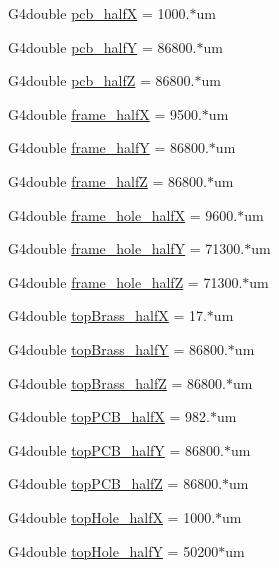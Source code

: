 \begin{DoxyCompactItemize}
G4double \hyperlink{structUMConfig_a89f67c198c9542cc4421a2dc60c52b36}{pcb\+\_\+half\+X} = 1000.$\ast$um
\item 
G4double \hyperlink{structUMConfig_a6c1fe8140f1fd3613eb3d4b1f77ca13e}{pcb\+\_\+half\+Y} = 86800.$\ast$um
\item 
G4double \hyperlink{structUMConfig_a05fe3c41c98a76ff002c175229aedecc}{pcb\+\_\+half\+Z} = 86800.$\ast$um
\item 
G4double \hyperlink{structUMConfig_aafe2777462b266d6e826f29780f41734}{frame\+\_\+half\+X} = 9500.$\ast$um
\item 
G4double \hyperlink{structUMConfig_a1c381ab5ce297e813cdd3b107c3b3273}{frame\+\_\+half\+Y} = 86800.$\ast$um
\item 
G4double \hyperlink{structUMConfig_aadc0e348b160d53a5a5b86ff0574c6d0}{frame\+\_\+half\+Z} = 86800.$\ast$um
\item 
G4double \hyperlink{structUMConfig_a5904fb1d13dd60fcb6a50de8e5789340}{frame\+\_\+hole\+\_\+half\+X} = 9600.$\ast$um
\item 
G4double \hyperlink{structUMConfig_a1722d57024f27b74d518c5abf804e096}{frame\+\_\+hole\+\_\+half\+Y} = 71300.$\ast$um
\item 
G4double \hyperlink{structUMConfig_ac793ed9de1cb61e5a19e27ca6ca2bee8}{frame\+\_\+hole\+\_\+half\+Z} = 71300.$\ast$um
\item 
G4double \hyperlink{structUMConfig_a43a19c4dafb2b14f2035307cea692735}{top\+Brass\+\_\+half\+X} = 17.$\ast$um
\item 
G4double \hyperlink{structUMConfig_ab11e88c0b8d6bbed643861d87ac07625}{top\+Brass\+\_\+half\+Y} = 86800.$\ast$um
\item 
G4double \hyperlink{structUMConfig_a24dd283c57244dc324355ab3dea5bdd0}{top\+Brass\+\_\+half\+Z} = 86800.$\ast$um
\item 
G4double \hyperlink{structUMConfig_a11a04ed6303378bb1f6121ae786d4805}{top\+P\+C\+B\+\_\+half\+X} = 982.$\ast$um
\item 
G4double \hyperlink{structUMConfig_a33a3c114dd5c4e32308c808729bb30c3}{top\+P\+C\+B\+\_\+half\+Y} = 86800.$\ast$um
\item 
G4double \hyperlink{structUMConfig_a9b94de55cce711aedf3d05c17af0afb2}{top\+P\+C\+B\+\_\+half\+Z} = 86800.$\ast$um
\item 
G4double \hyperlink{structUMConfig_ac5be4042d6c309ebba82b98d80f86f9c}{top\+Hole\+\_\+half\+X} = 1000.$\ast$um
\item 
G4double \hyperlink{structUMConfig_ac56805f73cb5ee549501a1acc5c71ed2}{top\+Hole\+\_\+half\+Y} = 50200$\ast$um

\end{DoxyCompactItemize}
